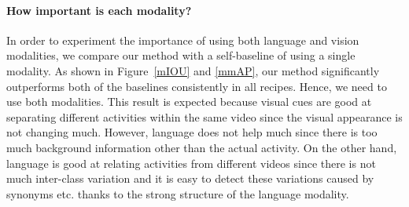 \paragraph{How important is each modality?}
In order to experiment the importance of using both language and vision modalities, we compare our method with a self-baseline of using a single modality. As shown in Figure~\ref{mIOU} and \ref{mmAP}, our method significantly outperforms both of the baselines consistently in all recipes. Hence, we need to use both modalities. This result is expected because visual cues are good at separating different activities within the same video since the visual appearance is not changing much. However, language does not help much since there is too much background information other than the actual activity. On the other hand, language is good at relating activities from different videos since there is not much inter-class variation and it is easy to detect these variations caused by synonyms etc. thanks to the strong structure of the language modality.
